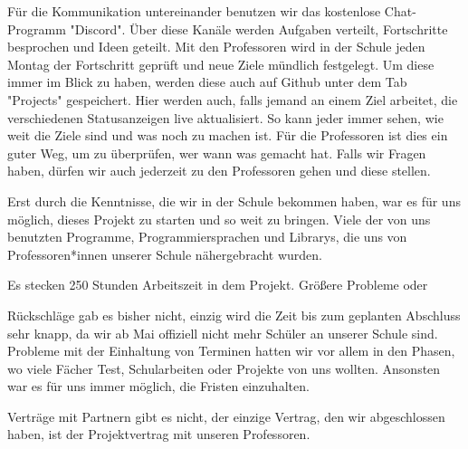 Für die Kommunikation untereinander benutzen wir das kostenlose Chat-Programm "Discord". Über diese Kanäle werden Aufgaben verteilt, Fortschritte besprochen und Ideen geteilt. Mit den Professoren wird in der Schule jeden Montag der Fortschritt geprüft und neue Ziele mündlich festgelegt. Um diese immer im Blick zu haben, werden diese auch auf Github unter dem Tab "Projects" gespeichert. Hier werden auch, falls jemand an einem Ziel arbeitet, die verschiedenen Statusanzeigen live aktualisiert. So kann jeder immer sehen, wie weit die Ziele sind und was noch zu machen ist. Für die Professoren ist dies ein guter Weg, um zu überprüfen, wer wann was gemacht hat. Falls wir Fragen haben, dürfen wir auch jederzeit zu den Professoren gehen und diese stellen.  

   

Erst durch die Kenntnisse, die wir in der Schule bekommen haben, war es für uns möglich, dieses Projekt zu starten und so weit zu bringen. Viele der von uns benutzten Programme, Programmiersprachen und Librarys, die uns von Professoren*innen unserer Schule nähergebracht wurden. 

Es stecken 250 Stunden Arbeitszeit in dem Projekt. Größere Probleme oder  

Rückschläge gab es bisher nicht, einzig wird die Zeit bis zum geplanten Abschluss sehr knapp, da wir ab Mai offiziell nicht mehr Schüler an unserer Schule sind. Probleme mit der Einhaltung von Terminen hatten wir vor allem in den Phasen, wo viele Fächer Test, Schularbeiten oder Projekte von uns wollten. Ansonsten war es für uns immer möglich, die Fristen einzuhalten. 

Verträge mit Partnern gibt es nicht, der einzige Vertrag, den wir abgeschlossen haben, ist der Projektvertrag mit unseren Professoren.  

  